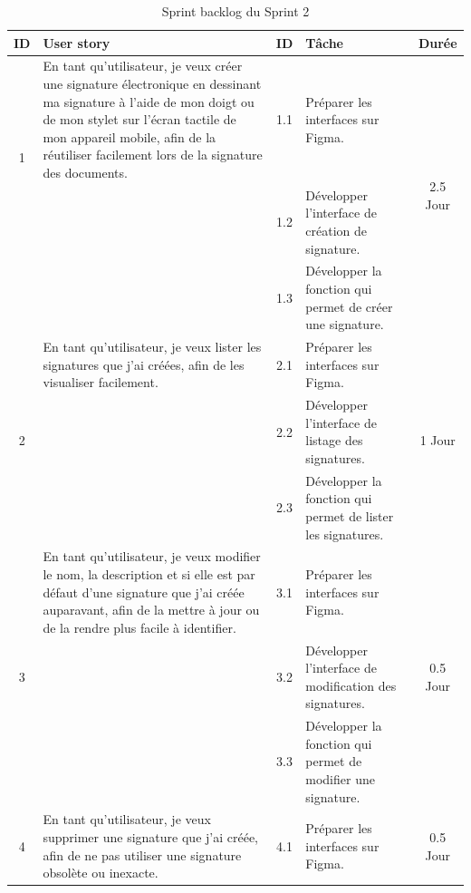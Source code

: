 \begin{adjustwidth}{-1cm}{}
    
    \begin{longtable}{|c|p{6cm}|c|p{6cm}|c|}
      \caption{Sprint backlog du Sprint 2} \label{tab:sprint-backlog-2} \\
      \hline
      \textbf{ID} & \textbf{User story} & \textbf{ID}  & \textbf{Tâche} & \textbf{Durée} \\
      \hline
      \multirow{2}{*}{1} & En tant qu'utilisateur, je veux créer une signature électronique en dessinant ma signature à l'aide de mon doigt ou de mon stylet sur l'écran tactile de mon appareil mobile, afin de la réutiliser facilement lors de la signature des documents. & 1.1 & Préparer les interfaces sur Figma. & \multirow{3}{*}{2.5 Jour} \\
      \cline{3-4}
      & & 1.2 & Développer l'interface de création de signature. & \\
      \cline{3-4}
      & & 1.3 & Développer la fonction qui permet de créer une signature. & \\
      \cline{1-5}
      \multirow{3}{*}{2} & En tant qu'utilisateur, je veux lister les signatures que j'ai créées, afin de les visualiser facilement. & 2.1 & Préparer les interfaces sur Figma. & \multirow{3}{*}{1 Jour} \\
      \cline{3-4}
      & & 2.2 & Développer l'interface de listage des signatures. & \\
      \cline{3-4}
      & & 2.3 & Développer la fonction qui permet de lister les signatures. & \\
      \cline{1-5}
      \multirow{3}{*}{3} & En tant qu'utilisateur, je veux modifier le nom, la description et si elle est par défaut d'une signature que j'ai créée auparavant, afin de la mettre à jour ou de la rendre plus facile à identifier. & 3.1 & Préparer les interfaces sur Figma. & \multirow{3}{*}{0.5 Jour} \\
      \cline{3-4}
      & & 3.2 & Développer l'interface de modification des signatures. & \\
      \cline{3-4}
      & & 3.3 & Développer la fonction qui permet de modifier une signature. & \\
      \cline{1-5}
      \multirow{3}{*}{4} & \multirow{3}{6cm}{En tant qu'utilisateur, je veux supprimer une signature que j'ai créée, afin de ne pas utiliser une signature
      obsolète ou inexacte.} & 4.1 & Préparer les interfaces sur Figma. & \multirow{3}{*}{0.5 Jour} \\

\end{longtable}
\end{adjustwidth}
